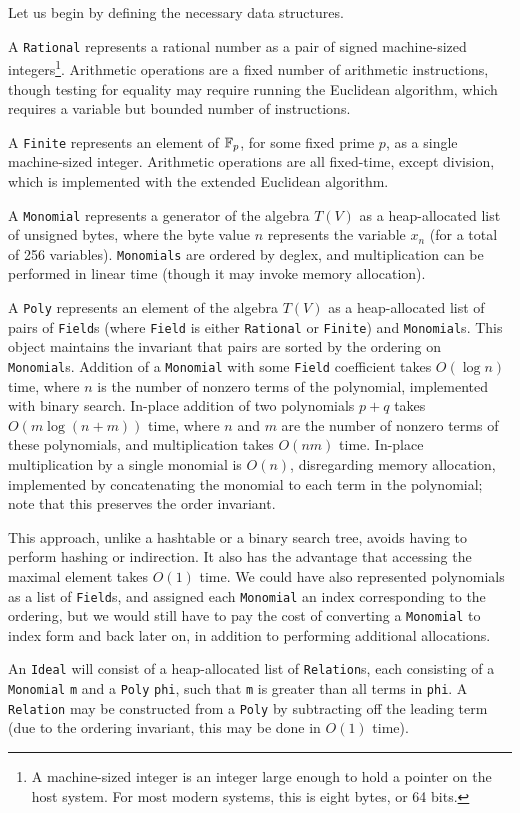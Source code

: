 Let us begin by defining the necessary data structures.

\begin{defn}
    A \verb|Rational| represents a rational number as a pair of signed machine-sized 
    integers\footnote{A machine-sized integer is an integer large enough to hold a pointer on
    the host system. For most modern systems, this is eight bytes, or 64 bits.}. Arithmetic
    operations are a fixed number of arithmetic instructions, though testing for equality
    may require running the Euclidean algorithm, which requires a variable but bounded number 
    of instructions.
    
    A \verb|Finite| represents an element of $\mathbb{F}_p$, for some fixed prime $p$, as a
    single machine-sized integer. Arithmetic operations are all fixed-time, except division,
    which is implemented with the extended Euclidean algorithm.
    
    A \verb|Monomial| represents a generator of the algebra $T(V)$ as a heap-allocated
    list of unsigned bytes, where the byte value $n$ represents the variable $x_n$ 
    (for a total of 256 variables). \verb|Monomials| are ordered by deglex,
    and multiplication can be performed in linear time (though it may invoke memory
    allocation).

    A \verb|Poly| represents an element of the algebra $T(V)$ as a heap-allocated
    list of pairs of \verb|Field|s (where \verb|Field| is either \verb|Rational| or
    \verb|Finite|) and \verb|Monomial|s. This object maintains the
    invariant that pairs are sorted by the ordering on \verb|Monomial|s. Addition
    of a \verb|Monomial| with some \verb|Field| coefficient takes $O(\log n)$ time,
    where $n$ is the number of nonzero terms of the polynomial, implemented with binary
    search. In-place addition of two polynomials $p + q$ takes $O(m\log (n+m))$ time, 
    where $n$ and $m$ are the number of nonzero terms of these polynomials, and
    multiplication takes $O(nm)$ time. In-place multiplication by a single monomial
    is $O(n)$, disregarding memory allocation, implemented by concatenating the monomial
    to each term in the polynomial; note that this preserves the order invariant.
    
    This approach, unlike a hashtable or a binary
    search tree, avoids having to perform hashing or indirection. It also has the
    advantage that accessing the maximal element takes $O(1)$ time. We could have
    also represented polynomials as a list of \verb|Field|s, and assigned each
    \verb|Monomial| an index corresponding to the ordering, but we would still have to pay
    the cost of converting a \verb|Monomial| to index form and back later on, in addition
    to performing additional allocations.
    
    An \verb|Ideal| will consist of a heap-allocated list of \verb|Relation|s,
    each consisting of a \verb|Monomial| \verb|m| and a \verb|Poly| \verb|phi|, 
    such that \verb|m| is greater than all terms in \verb|phi|. A \verb|Relation|
    may be constructed from a \verb|Poly| by subtracting off the leading term (due
    to the ordering invariant, this may be done in $O(1)$ time).
\end{defn}


